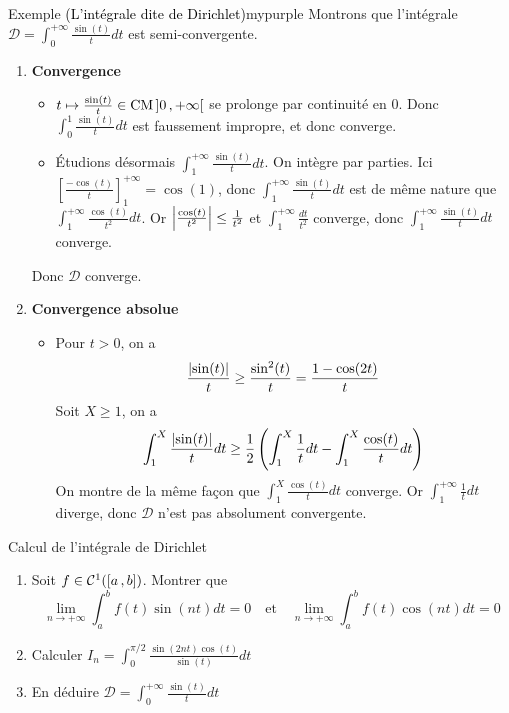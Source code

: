     \begin{omed}{Exemple \textcolor{black}{(L’intégrale dite de Dirichlet)}}{mypurple}
        Montrons que l’intégrale $\mathcal{D} = \int_{0}^{+\infty} \frac{\sin(t)}{t} dt$ est semi-convergente.
        \begin{enumerate}
            \item \textbf{Convergence}
            
            \begin{itemize}
                \item $t \mapsto \frac{\sin(t)}{t} \in \operatorname{CM} \left] 0 \, , +\infty \right[$ se prolonge par continuité en $0$. Donc $\int_{0}^{1} \frac{\sin(t)}{t}dt$ est faussement impropre, et donc converge.
                \item Étudions désormais $\int_{1}^{+\infty} \frac{\sin(t)}{t}dt$. On intègre par parties. Ici $\left[ \frac{-\cos(t)}{t} \right]_1^{+\infty} = \cos(1)$, donc $\int_{1}^{+\infty} \frac{\sin(t)}{t} dt$ est de même nature que $\int_{1}^{+\infty} \frac{\cos(t)}{t^2}dt$. Or $\left\lvert \frac{\cos(t)}{t^2}\right\rvert \leq \frac{1}{t^2}$ et $\int_{1}^{+\infty} \frac{dt}{t^2}$ converge, donc $\int_{1}^{+\infty} \frac{\sin(t)}{t}dt$ converge.
            \end{itemize}

            Donc $\mathcal{D}$ converge.
            \item \textbf{Convergence absolue}
            
            \begin{itemize}
                \item Pour $t > 0$, on a 
                \[ \frac{\left\lvert \sin(t)\right\rvert}{t} \geq \frac{\sin^2(t)}{t} = \frac{1 - \cos(2t)}{t} \]   
                Soit $X \geq 1$, on a 
                \[ \int_{1}^{X} \frac{\left\lvert \sin(t)\right\rvert}{t}dt \geq \frac{1}{2} \left( \int_{1}^{X} \frac{1}{t}dt - \int_{1}^{X} \frac{\cos(t)}{t} dt\right) \]   
                On montre de la même façon que $\int_{1}^{X} \frac{\cos(t)}{t} dt$ converge. Or $\int_{1}^{+\infty} \frac{1}{t}dt$ diverge, donc $\mathcal{D}$ n’est pas absolument convergente.
            \end{itemize}
        \end{enumerate}
    \end{omed}

    \begin{exo}{Calcul de l’intégrale de Dirichlet}{}
        \begin{enumerate}
            \item Soit $f \in \mathcal{C}^1(\left[ a \, , b \right])$. Montrer que \[ \lim_{n \to +\infty} \int_{a}^{b} f(t) \sin(nt)dt = 0 \quad \text{et} \quad \lim_{n \to +\infty} \int_{a}^{b} f(t) \cos(nt)dt = 0 \]
            \item Calculer $I_n = \int_{0}^{\pi/2} \frac{\sin(2nt) \cos(t)}{\sin(t)}dt$
            \item En déduire $\mathcal{D} = \int_{0 }^{+\infty} \frac{\sin(t)}{t}dt$
        \end{enumerate}
    \end{exo}

